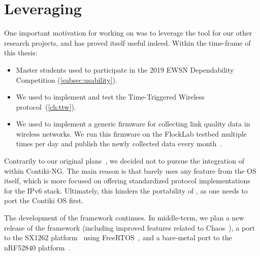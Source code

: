 
\section{Leveraging \baloo}
\label{sec:outcomes}

One important motivation for working on \baloo was to leverage the tool for our other research projects, and \baloo has proved itself useful indeed.
Within the time-frame of this thesis:
\begin{itemize}
  \item Master students used \baloo to participate in the 2019 EWSN Dependability Competition (\cref{subsec:usability}).
  \item We used \baloo to implement and test the Time-Triggered Wireless protocol~(\cref{ch:ttw}).
  \item We used \baloo to implement a generic firmware for collecting link quality data in wireless networks. We run this firmware on the FlockLab testbed multiple times per day and publish the newly collected data every month~\cite{jacobFlockLabLinkQuality}.
\end{itemize}

Contrarily to our original plans~\cite{jacob2019Baloo}, we decided not to pursue the integration of \baloo within Contiki-NG. The main reason is that \baloo barely uses any feature from the OS itself, which is more focused on offering standardized protocol implementations for the IPv6 stack. Ultimately, this hinders the portability of \baloo, as one needs to port the Contiki OS first.

The development of the \baloo framework continues. In middle-term, we plan a new release of the framework (including improved features related to Chaos~\cite{landsiedel2013Chaos}), a port to the SX1262 platform~\cite{semtechSX1262} using FreeRTOS~\cite{FreeRTOS}, and a bare-metal port to the nRF52840 platform~\cite{nRF52840}.
